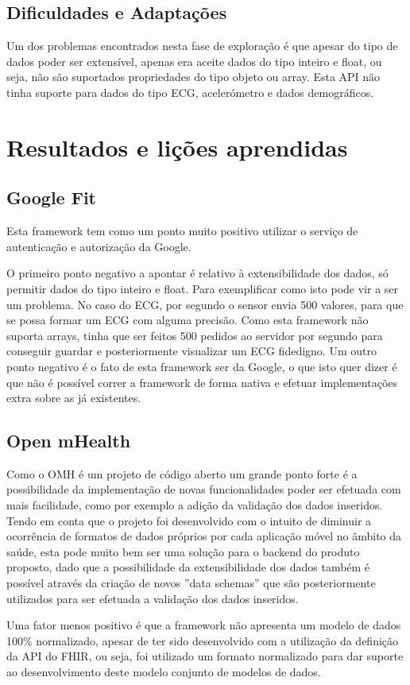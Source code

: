 \subsection{Dificuldades e Adaptações}

Um dos problemas encontrados nesta fase de exploração é que apesar do tipo de dados poder ser extensível, apenas era aceite dados do tipo inteiro e float, ou seja, não são suportados propriedades do tipo objeto ou array. Esta \gls{API} não tinha suporte para dados do tipo \gls{ECG}, acelerómetro e dados demográficos.

\section{Resultados e lições aprendidas}
\subsection{Google Fit}
Esta framework tem como um ponto muito positivo utilizar o serviço de autenticação e autorização da Google.\par 
O primeiro ponto negativo a apontar é relativo à extensibilidade dos dados, só permitir dados do tipo inteiro e float. Para exemplificar como isto pode vir a ser um problema. No caso do \gls{ECG}, por segundo o sensor envia 500 valores, para que se possa formar um \gls{ECG} com alguma precisão. Como esta framework não suporta arrays, tinha que ser feitos 500 pedidos ao servidor por segundo para conseguir guardar e posteriormente visualizar um \gls{ECG} fidedigno. Um outro ponto negativo é o fato de esta framework ser da Google, o que isto quer dizer é que não é possível correr a framework de forma nativa e efetuar implementações extra sobre as já existentes.
\subsection{Open mHealth}
Como o \gls{OMH} é um projeto de código aberto um grande ponto forte é a possibilidade da implementação de novas funcionalidades poder ser efetuada com mais facilidade, como por exemplo a adição da validação dos dados inseridos. Tendo em conta que o projeto foi desenvolvido com o intuito de diminuir a ocorrência de formatos de dados próprios por cada aplicação móvel no âmbito da saúde, esta pode muito bem ser uma solução para o backend do produto proposto, dado que a possibilidade da extensibilidade dos dados também é possível através da criação de novos ''data schemas'' que são posteriormente utilizados para ser efetuada a validação dos dados inseridos.
\par
Uma fator menos positivo é que a framework não apresenta um modelo de dados 100\% normalizado, apesar de ter sido desenvolvido com a utilização da definição da \gls{API} do \gls{FHIR}, ou seja, foi utilizado um formato normalizado para  dar suporte ao desenvolvimento deste modelo conjunto de modelos de dados.
